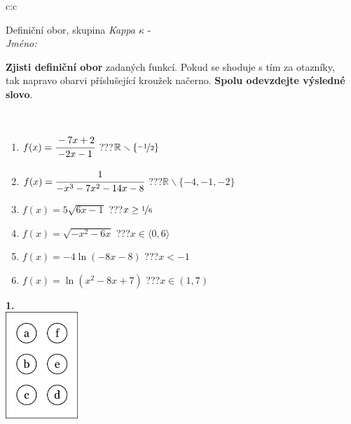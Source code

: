 \documentclass[10pt]{report}
\begin{document}
\begin{tabular}{c:c}
\begin{minipage}[c][104.5mm][t]{0.5\linewidth}
\begin{center}
\vspace{7mm}
{\huge Definiční obor, skupina \textit{Kappa $\kappa$} -}\\[5mm]
\textit{Jméno:}\phantom{xxxxxxxxxxxxxxxxxxxxxxxxxxxxxxxxxxxxxxxxxxxxxxxxxxxxxxxxxxxxxxxxx}\\[5mm]
\begin{minipage}{0.95\linewidth}
\begin{center}
\textbf{Zjisti definiční obor} zadaných funkcí. Pokud se shoduje s tím za otazníky,\\tak napravo obarvi příslušející kroužek načerno. \textbf{Spolu odevzdejte výsledné slovo}.
\end{center}
\end{minipage}
\\[1mm]
\begin{minipage}{0.79\linewidth}
\begin{center}
\begin{varwidth}{\linewidth}
\begin{enumerate}
\normalsizerrr
\item $f(x)=\cfrac{-7x+2}{-2x-1}$\quad \dotfill\; ???\;\dotfill \quad $\mathbb{R}\smallsetminus\{\nicefrac{-1}{2}\}$
\item $f(x)=\cfrac{1}{-x^3-7x^2-14x-8}$\quad \dotfill\; ???\;\dotfill \quad $\mathbb{R}\smallsetminus\{-4,-1,-2\}$
\item $f(x)=5\sqrt{6x-1}$\quad \dotfill\; ???\;\dotfill \quad $x\geq\nicefrac{1}{6}$
\item $f(x)=\sqrt{-x^2-6x}$\quad \dotfill\; ???\;\dotfill \quad $x\in\langle0 , 6\rangle$
\item $f(x)=-4\ln{(-8x-8)}$\quad \dotfill\; ???\;\dotfill \quad $x<-1$
\item $f(x)=\ln{(x^2-8x+7)}$\quad \dotfill\; ???\;\dotfill \quad $x\in(1 , 7)$
\end{enumerate}
\end{varwidth}
\end{center}
\end{minipage}
\begin{minipage}{0.20\linewidth}
\begin{center}
{\Huge\bfseries 1.} \\[2mm]
\includegraphics[height=40mm]{../images/braille.png}

\end{center}
\end{minipage}
\end{center}
\end{minipage}
\end{tabular}
\end{document}
